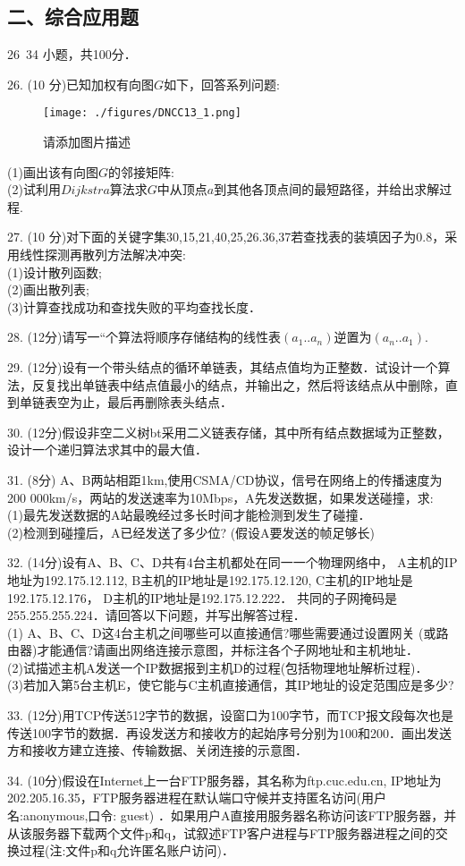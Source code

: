 \subsection{二、综合应用题}
26~34 小题，共100分．

26. (10 分)已知加权有向图$G$如下，回答系列问题: \\
\begin{figure}[ht]
\centering
\texttt{[image: ./figures/DNCC13\_1.png]}
\caption{请添加图片描述} \label{DNCC13_fig1}
\end{figure}
(1)画出该有向图$G$的邻接矩阵: \\
(2)试利用$Dijkstra$算法求$G$中从顶点$a$到其他各顶点间的最短路径，并给出求解过程.

27. (10 分)对下面的关键字集{30,15,21,40,25,26.36,37}若查找表的装填因子为$0.8$，采用线性探测再散列方法解决冲突: \\
(1)设计散列函数; \\
(2)画出散列表; \\
(3)计算查找成功和查找失败的平均查找长度．

28. (12分)请写一“个算法将顺序存储结构的线性表$(a_1..a_n)$逆置为$(a_n..a_1)$.

29. (12分)设有一个带头结点的循环单链表，其结点值均为正整数．试设计一个算法，反复找出单链表中结点值最小的结点，并输出之，然后将该结点从中删除，直到单链表空为止，最后再删除表头结点．

30. (12分)假设非空二义树bt采用二义链表存储，其中所有结点数据域为正整数，设计一个递归算法求其中的最大值．

31. (8分) A、B两站相距1km,使用CSMA/CD协议，信号在网络上的传播速度为200 000km/s，两站的发送速率为10Mbps，A先发送数据，如果发送碰撞，求: \\
(1)最先发送数据的A站最晚经过多长时间才能检测到发生了碰撞． \\
(2)检测到碰撞后，A已经发送了多少位? (假设A要发送的帧足够长)

32. (14分)设有A、B、C、D共有4台主机都处在同一一个物理网络中， A主机的IP地址为192.175.12.112, B主机的IP地址是192.175.12.120, C主机的IP地址是192.175.12.176， D主机的IP地址是192.175.12.222． 共同的子网掩码是255.255.255.224．请回答以下问题，并写出解答过程． \\
(1) A、B、C、D这4台主机之间哪些可以直接通信?哪些需要通过设置网关
(或路由器)才能通信?请画出网络连接示意图，并标注各个子网地址和主机地址． \\
(2)试描述主机A发送一个IP数据报到主机D的过程(包括物理地址解析过程)． \\
(3)若加入第5台主机E，使它能与C主机直接通信，其IP地址的设定范围应是多少?

33. (12分)用TCP传送512字节的数据，设窗口为100字节，而TCP报文段每次也是传送100字节的数据．再设发送方和接收方的起始序号分别为100和200．画出发送方和接收方建立连接、传输数据、关闭连接的示意图．

34. (10分)假设在Internet上一台FTP服务器，其名称为ftp.cuc.edu.cn, IP地址为202.205.16.35，FTP服务器进程在默认端口守候并支持匿名访问(用户名:anonymous,口令: guest) ．如果用户A直接用服务器名称访问该FTP服务器，并从该服务器下载两个文件p和q，试叙述FTP客户进程与FTP服务器进程之间的交换过程(注:文件p和q允许匿名账户访问)．